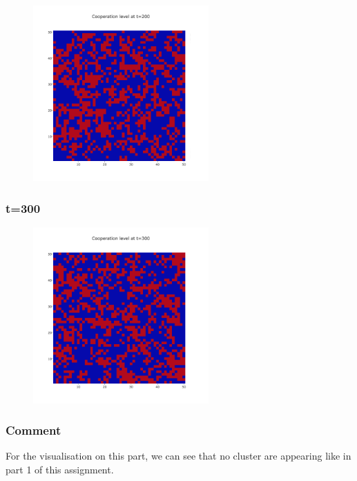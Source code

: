 \documentclass[11pt]{article}
\begin{document}
\begin{figure}[H]
\centering
   \includegraphics[width=0.6\textwidth]{img/part2/part2-moore-visu-200.png}
\end{figure}

\subsubsection{t=300}

\begin{figure}[H]
\centering
   \includegraphics[width=0.6\textwidth]{img/part2/part2-moore-visu-300.png}
\end{figure}

\subsubsection{Comment}

For the visualisation on this part, we can see that no cluster are appearing like in part 1 of this assignment.
\end{document}
